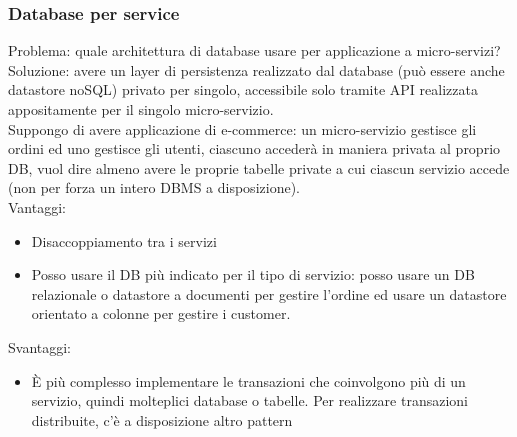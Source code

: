 \documentclass[16px]{article}
\begin{document}
\subsubsection{Database per service}
Problema: quale architettura di database usare per applicazione a micro-servizi?\\ Soluzione: avere un layer di persistenza realizzato dal database (può essere anche datastore noSQL) privato per singolo, accessibile solo tramite API realizzata appositamente per il singolo micro-servizio.\\ Suppongo di avere applicazione di e-commerce: un micro-servizio gestisce gli ordini ed uno gestisce gli utenti, ciascuno accederà in maniera privata al proprio DB, vuol dire almeno avere le proprie tabelle private a cui ciascun servizio accede (non per forza un intero DBMS a disposizione).\\ Vantaggi:
\begin{itemize}
\item Disaccoppiamento tra i servizi
\item Posso usare il DB più indicato per il tipo di servizio: posso usare un DB relazionale o datastore a documenti per gestire l'ordine ed usare un datastore orientato a colonne per gestire i customer.
\end{itemize}
Svantaggi:
\begin{itemize}
\item È più complesso implementare le transazioni che coinvolgono più di un servizio, quindi molteplici database o tabelle. Per realizzare transazioni distribuite, c'è a disposizione altro pattern
\end{itemize}
\end{document}
